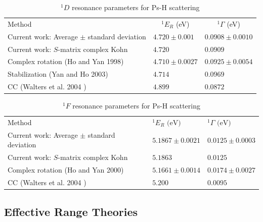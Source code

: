 \documentclass[preprint,showpacs,showkeys,preprintnumbers,amsmath,amssymb,longbibliography,pra,aps]{revtex4-1}
\newcommand*{\thead}[1]{\multicolumn{1}{c}{#1}}
\begin{document}
{\begin{table}[H]
\begin{center}
\begin{ruledtabular}
\begin{tabular}{l l l}
Method & \thead{$^1E_R$ (eV)} & \thead{$^1\Gamma$ (eV)} \\
\colrule
Current work: Average $\pm$ standard deviation & $4.720 \pm 0.001$ & $0.0908 \pm 0.0010$ \\
Current work: $S$-matrix complex Kohn & $4.720$ & $0.0909$ \\
Complex rotation (Ho and Yan 1998) \cite{Ho1998} & $4.710 \pm 0.0027$ & $0.0925 \pm 0.0054$  \\
Stabilization (Yan and Ho 2003) \cite{Yan2003} & $4.714$ & $0.0969$ \\
CC (Walters et al. 2004 \cite{Walters2004}) & $4.899$ & $0.0872$ \\
\end{tabular}
\end{ruledtabular}
\caption{$^1D$ resonance parameters for Ps-H scattering}
\label{tab:DWaveResonances}
\end{center}
\end{table}


\begin{table}[H]
\begin{center}
\begin{ruledtabular}
\begin{tabular}{l l l}
Method & $^1E_R \text{ (eV)}$ & $^1\Gamma \text{ (eV)}$ \\
\colrule
Current work: Average $\pm$ standard deviation & $5.1867 \pm 0.0021$ & $0.0125 \pm 0.0003$ \\
Current work: $S$-matrix complex Kohn & $5.1863$ & $0.0125$ \\
Complex rotation (Ho and Yan 2000) \cite{Ho2000} & $5.1661 \pm 0.0014$ & $0.0174 \pm 0.0027$  \\
CC (Walters et al. 2004 \cite{Walters2004}) & $5.200$ & $0.0095$ \\
\end{tabular}
\end{ruledtabular}
\caption{$^1F$ resonance parameters for Ps-H scattering}
\label{tab:FWaveResonances}
\end{center}
\end{table}


\subsection{Effective Range Theories}

}
\end{document}
